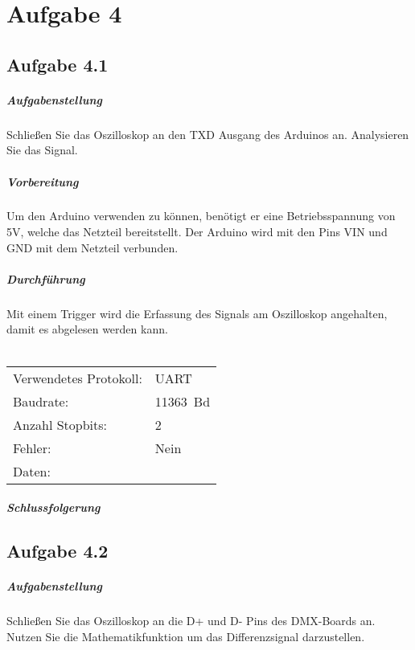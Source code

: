 \chapter{Aufgabe 4}
\section{Aufgabe 4.1}
\paragraph{Aufgabenstellung}
Schließen Sie das Oszilloskop an den TXD Ausgang des Arduinos an. Analysieren Sie das Signal.

\paragraph{Vorbereitung}
Um den Arduino verwenden zu können, benötigt er eine Betriebsspannung von 5V, welche das Netzteil bereitstellt. Der Arduino wird mit den Pins VIN und GND mit dem Netzteil verbunden.

\paragraph{Durchführung}
Mit einem Trigger wird die Erfassung des Signals am Oszilloskop angehalten, damit es abgelesen werden kann.\\\\
\begin{tabular}{ll}
	Verwendetes Protokoll: & UART       \\
	Baudrate:              & \SI{11363}{Bd} \\
	Anzahl Stopbits:       & 2          \\
	Fehler:                & Nein       \\
	Daten:                 &
\end{tabular}

\paragraph{Schlussfolgerung}


\section{Aufgabe 4.2}
\paragraph{Aufgabenstellung}
Schließen Sie das Oszilloskop an die D+ und D- Pins des DMX-Boards an. Nutzen Sie die Mathematikfunktion um das Differenzsignal darzustellen.

